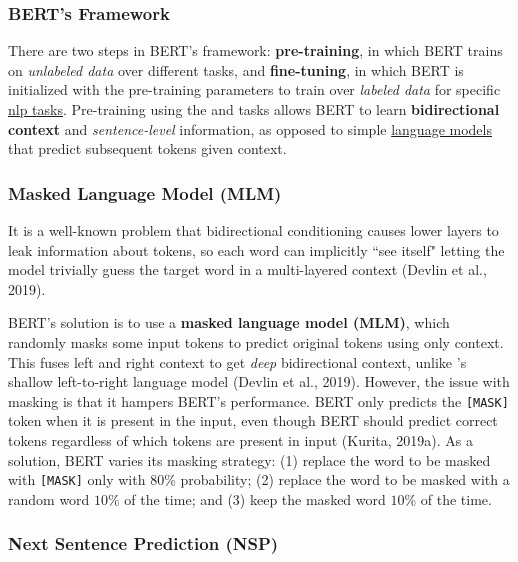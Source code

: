 \subsubsection{BERT's Framework}
 
There are two steps in BERT's framework: \textbf{pre-training}, in which BERT trains on \emph{unlabeled data} over different tasks, and \textbf{fine-tuning}, in which BERT is initialized with the pre-training parameters to train over \emph{labeled data} for specific \hyperref[app:Appendix_NLPTasks]{nlp tasks}. Pre-training using the  and  tasks allows BERT to learn \textbf{bidirectional context} and \emph{sentence-level} information, as opposed to simple \hyperref[sec:LanguageModels]{language models} that predict subsequent tokens given context. 


\subsubsection{Masked Language Model (MLM)} \label{sec:maskedlanguagemodelMLM}

It is a well-known problem that bidirectional conditioning causes lower layers to leak information about tokens, so each word can implicitly ``see itself" letting the model trivially guess the target word in a multi-layered context (Devlin et al., 2019).  

BERT's solution is to use a \textbf{masked language model (MLM)}, which randomly masks some input tokens to predict original tokens using only context. This fuses left and right context to get \emph{deep} bidirectional context, unlike 's shallow left-to-right language model (Devlin et al., 2019). However, the issue with masking is that it hampers BERT's performance. BERT only predicts the \texttt{[MASK]} token when it is present in the input, even though BERT should predict correct tokens regardless of which tokens are present in input (Kurita, 2019a). As a solution, BERT varies its masking strategy: (1) replace the word to be masked with \texttt{[MASK]} only with $80\%$ probability; (2) replace the word to be masked with a random word $10 \%$ of the time; and (3) keep the masked word $10 \%$ of the time. 


\subsubsection{Next Sentence Prediction (NSP)} \label{sec:nextsentencepredictionNSP}

